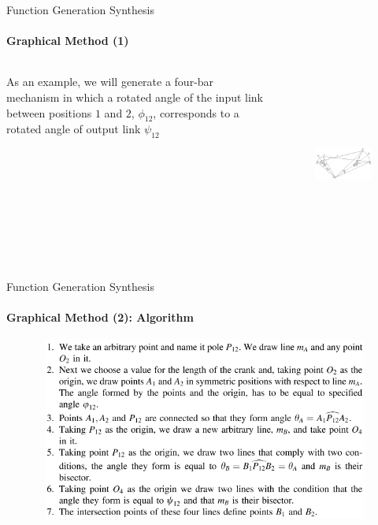 \documentclass[aspectratio=169]{beamer}
\begin{document}
\begin{frame}[t]{Function Generation Synthesis}
\framesubtitle{Graphical Method (1)}
    \begin{columns}[T,onlytextwidth]
        \begin{column}{0.39\textwidth}
            As an example, we will generate a four-bar mechanism in which a rotated angle of the input link between positions $1$ and $2$, $\phi_12$, corresponds to a rotated angle of output link $\psi_12$
        \end{column}
        \begin{column}{0.59\textwidth}
            \vspace{-0.6cm}
            \begin{figure}[H]
                \centering\includegraphics[height=6cm,width=1\textwidth,keepaspectratio]{func_gen6.png}
                \label{fig:func_gen6.png}
            \end{figure}
        \end{column}
    \end{columns}
\end{frame}

\begin{frame}[t]{Function Generation Synthesis}
    \framesubtitle{Graphical Method (2): Algorithm}
    \vspace{-0.8cm}
    \begin{figure}[H]
        \centering\includegraphics[height=6cm,width=1\textwidth,keepaspectratio]{func_gen7.png}
        \label{fig:func_gen7.png}
    \end{figure}
\end{frame}
\end{document}
